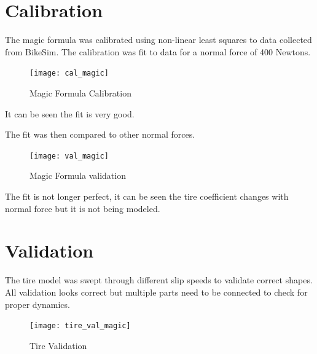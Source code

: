 \documentclass[../SimBALink.tex]{subfiles}
\begin{document}
\section{Calibration}
The magic formula was calibrated using non-linear least squares to data collected from BikeSim. The calibration was fit to data for a normal force of 400 Newtons.

\begin{figure}[H]
\center
 \texttt{[image: cal\_magic]}
  \caption{Magic Formula Calibration}
\end{figure}

It can be seen the fit is very good.

The fit was then compared to other normal forces.

\begin{figure}[H]
\center
 \texttt{[image: val\_magic]}
  \caption{Magic Formula validation}
\end{figure}

The fit is not longer perfect, it can be seen the tire coefficient changes with normal force but it is not being modeled.

\section{Validation}

The tire model was swept through different slip speeds to validate correct shapes. All validation looks correct but multiple parts need to be connected to check for proper dynamics. 

\begin{figure}[H]
\center
 \texttt{[image: tire\_val\_magic]}
  \caption{Tire Validation}
\end{figure}
\end{document}
